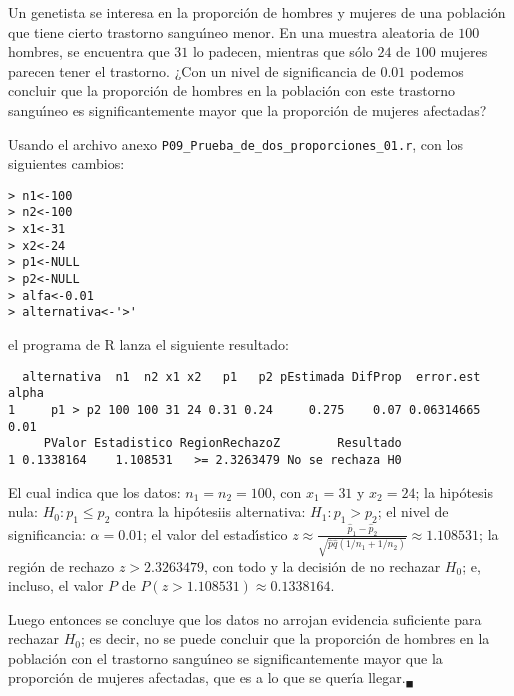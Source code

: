 \begin{enunciado}
 Un genetista se interesa en la proporci\'on de hombres y mujeres
 de una poblaci\'on que tiene cierto trastorno sangu\'{\i}neo menor.
 En una muestra aleatoria de $100$ hombres, se encuentra
 que $31$ lo padecen, mientras que s\'olo $24$ de $100$ mujeres parecen
 tener el trastorno.
 ¿Con un nivel de significancia de $0.01$ podemos concluir
 que la proporci\'on de hombres en la poblaci\'on
 con este trastorno sangu\'{\i}neo es significantemente mayor
 que la proporci\'on de mujeres afectadas?
\end{enunciado}

\begin{solucion}
 Usando el archivo anexo \texttt{P09\_Prueba\_de\_dos\_proporciones\_01.r}, con los siguientes cambios:
 \begin{verbatim}
> n1<-100
> n2<-100
> x1<-31
> x2<-24
> p1<-NULL
> p2<-NULL
> alfa<-0.01
> alternativa<-'>'
 \end{verbatim}
 \vspace{-0.5cm}
 el programa de R lanza el siguiente resultado:
 \begin{verbatim}
  alternativa  n1  n2 x1 x2   p1   p2 pEstimada DifProp  error.est alpha
1     p1 > p2 100 100 31 24 0.31 0.24     0.275    0.07 0.06314665  0.01
     PValor Estadistico RegionRechazoZ        Resultado
1 0.1338164    1.108531   >= 2.3263479 No se rechaza H0
 \end{verbatim}
 \vspace{-0.5cm}
 El cual indica que los datos: $n_1 = n_2 = 100$,
 con $x_1 = 31$ y $x_2 = 24$; la hip\'otesis nula: $H_0: p_1 \leq p_2$
 contra la hip\'otesiis alternativa: $H_1: p_1 > p_2$; el nivel
 de significancia: $\alpha = 0.01$; el valor del estad\'{\i}stico $z \approx
 \frac{\hat{p}_1 - \hat{p}_2}{\sqrt{\hat{p}\hat{q}(1/n_1+1/n_2)}} \approx
 1.108531$; la regi\'on de rechazo $z > 2.3263479$, con todo y la decisi\'on
 de no rechazar $H_0$; e, incluso, el valor $P$ de $P(z > 1.108531) \approx
 0.1338164$.
 \par 
 Luego entonces se concluye que los datos no arrojan evidencia suficiente
 para rechazar $H_0$; es decir, no se puede concluir que la proporci\'on
 de hombres en la poblaci\'on con el trastorno sangu\'{\i}neo
 se significantemente mayor que la proporci\'on de mujeres afectadas,
 que es a lo que se quer\'{\i}a llegar.${}_{\blacksquare}$
\end{solucion}
